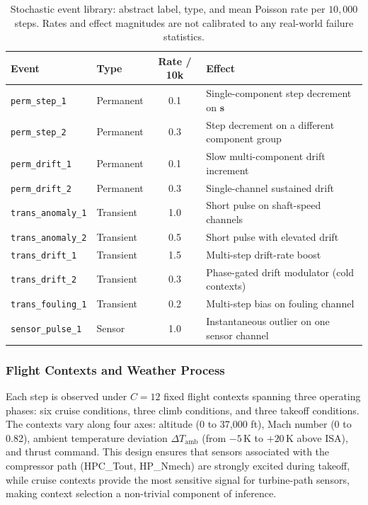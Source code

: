 \begin{table}[h]
\centering
\caption{Stochastic event library: abstract label, type, and mean
Poisson rate per $10{,}000$ steps. Rates and effect magnitudes are not
calibrated to any real-world failure statistics.}
\label{tab:events}
\small
\begin{tabular}{llcl}
\toprule
Event & Type & Rate / 10k & Effect \\
\midrule
\texttt{perm\_step\_1}     & Permanent  & 0.1 & Single-component step decrement on $\mathbf{s}$ \\
\texttt{perm\_step\_2}     & Permanent  & 0.3 & Step decrement on a different component group \\
\texttt{perm\_drift\_1}    & Permanent  & 0.1 & Slow multi-component drift increment \\
\texttt{perm\_drift\_2}    & Permanent  & 0.3 & Single-channel sustained drift \\
\texttt{trans\_anomaly\_1}   & Transient  & 1.0 & Short pulse on shaft-speed channels \\
\texttt{trans\_anomaly\_2}   & Transient  & 0.5 & Short pulse with elevated drift \\
\texttt{trans\_drift\_1}   & Transient  & 1.5 & Multi-step drift-rate boost \\
\texttt{trans\_drift\_2}   & Transient  & 0.3 & Phase-gated drift modulator (cold contexts) \\
\texttt{trans\_fouling\_1}  & Transient  & 0.2 & Multi-step bias on fouling channel \\
\texttt{sensor\_pulse\_1}  & Sensor     & 1.0 & Instantaneous outlier on one sensor channel \\
\bottomrule
\end{tabular}
\end{table}

\subsubsection{Flight Contexts and Weather Process}
\label{sec:dataset_contexts}

Each step is observed under $C = 12$ fixed flight contexts spanning
three operating phases: six cruise conditions, three climb conditions,
and three takeoff conditions. The contexts vary along four axes: altitude
(0 to 37{,}000 ft), Mach number (0 to 0.82), ambient temperature
deviation $\Delta T_\mathrm{amb}$ (from $-5$\,K to $+20$\,K above ISA),
and thrust command. This design ensures that sensors associated with the
compressor path (HPC\_Tout, HP\_Nmech) are strongly excited during
takeoff, while cruise contexts provide the most sensitive signal for
turbine-path sensors, making context selection a non-trivial component
of inference.

